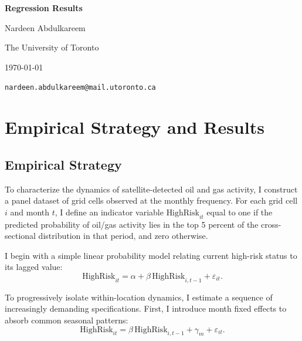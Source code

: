 \documentclass[12pt]{article}
\begin{document}
\begin{titlepage}
    \thispagestyle{empty} %
    \centering
    \vspace*{\fill}

    {\Large \textbf{Regression Results} \par}

    \vspace{3em}
    {\large Nardeen Abdulkareem \par}
    {\normalsize The University of Toronto \par}
    {\normalsize \today \par}
    {\texttt{nardeen.abdulkareem@mail.utoronto.ca} \par}

    \vspace*{\fill}
\end{titlepage}
\clearpage
\section{Empirical Strategy and Results}

\subsection{Empirical Strategy}

To characterize the dynamics of satellite-detected oil and gas activity, I construct a panel dataset of grid cells observed at the monthly frequency. For each grid cell $i$ and month $t$, I define an indicator variable $\text{HighRisk}_{it}$ equal to one if the predicted probability of oil/gas activity lies in the top 5 percent of the cross-sectional distribution in that period, and zero otherwise.

I begin with a simple linear probability model relating current high-risk status to its lagged value:
\begin{equation}
\text{HighRisk}_{it} = \alpha + \beta \, \text{HighRisk}_{i,t-1} + \varepsilon_{it}.
\end{equation}

To progressively isolate within-location dynamics, I estimate a sequence of increasingly demanding specifications. First, I introduce month fixed effects to absorb common seasonal patterns:
\begin{equation}
\text{HighRisk}_{it} = \beta \, \text{HighRisk}_{i,t-1} + \gamma_m + \varepsilon_{it}.
\end{equation}
\end{document}

